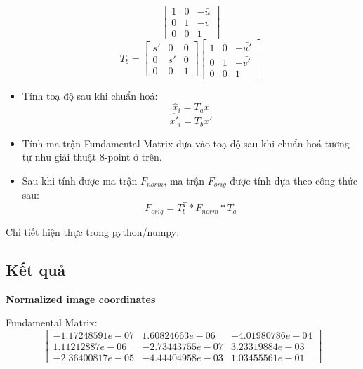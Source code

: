 \documentclass[11pt]{article}
\begin{document}
\begin{itemize}
\begin{equation*}
\begin{bmatrix}
                1 & 0 & -\bar{u} \\
                0 & 1 & -\bar{v} \\
                0 & 0 & 1
            \end{bmatrix}
        \end{equation*}
        \begin{equation*}
            T_b = 
            \begin{bmatrix}
                s' & 0 & 0 \\
                0 & s' & 0 \\
                0 & 0 & 1
            \end{bmatrix}
            \begin{bmatrix}
                1 & 0 & -\bar{u'} \\
                0 & 1 & -\bar{v'} \\
                0 & 0 & 1
            \end{bmatrix}
        \end{equation*}
    \item Tính toạ độ sau khi chuẩn hoá:
        \begin{equation*}
            \hat{x}_i = T_a x
        \end{equation*}
        \begin{equation*}
            \hat{x'}_i = T_b x'
        \end{equation*}
    \item Tính ma trận Fundamental Matrix dựa vào toạ độ sau khi chuẩn hoá tương tự như giải thuật 8-point ở trên.
    \item Sau khi tính được ma trận $F_{\mathit{norm}}$, ma trận $F_{\mathit{orig}}$ được tính dựa theo công thức sau:
        \begin{equation*}
            F_{\mathit{orig}} = T_b^T \ast F_{norm} \ast T_{a}
        \end{equation*}
\end{itemize}

Chi tiết hiện thực trong python/numpy:


\subsection*{Kết quả}
\textbf{Normalized image coordinates}

Fundamental Matrix:
\begin{equation*}
    \begin{bmatrix}
        -1.17248591e-07 & 1.60824663e-06 &-4.01980786e-04    \\
        1.11212887e-06 &-2.73443755e-07 & 3.23319884e-03    \\
        -2.36400817e-05 & -4.44404958e-03 & 1.03455561e-01
    \end{bmatrix}
\end{equation*}
\end{document}
